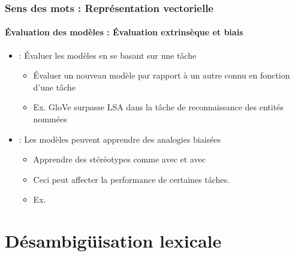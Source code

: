 \documentclass[xcolor=table]{beamer}
\begin{document}
\begin{frame}
\frametitle{Sens des mots : Représentation vectorielle}
\framesubtitle{Évaluation des modèles : Évaluation extrinsèque et biais}
	
\begin{itemize}
	\item  {} : Évaluer les modèles en se basant sur une tâche 
	\begin{itemize}
		\item Évaluer un nouveau modèle par rapport à un autre connu en fonction d'une tâche
		\item Ex. GloVe surpasse LSA dans la tâche de reconnaissance des entités nommées \cite{2014-pennington-al}
	\end{itemize}
	\item {} : Les modèles peuvent apprendre des analogies biaisées
	\begin{itemize}
		\item Apprendre des stéréotypes comme  avec  et  avec  \cite{2017-caliskan-al}
		\item Ceci peut affecter la performance de certaines tâches. 
		\item Ex. 
	\end{itemize}
\end{itemize}
	
\end{frame}


\section{Désambigüisation lexicale}
\end{document}
